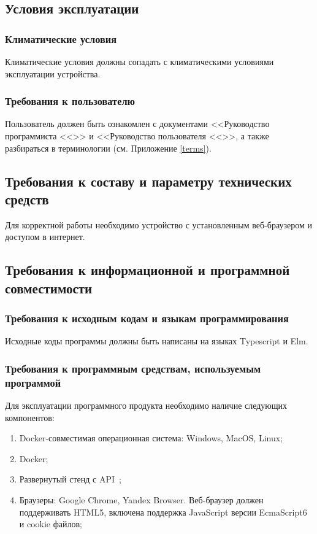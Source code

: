\documentclass[a4paper,12pt,reqno]{article}
\begin{document}
	
	\subsection{Условия эксплуатации}
	\subsubsection{Климатические условия}
	Климатические условия должны сопадать с климатическими условиями эксплуатации устройства. 
	\subsubsection{Требования к пользователю}
	
	Пользователь должен быть ознакомлен с документами <<Руководство программиста  <<>> и <<Руководство пользователя <<>>, а также разбираться в терминологии (см. Приложение \ref{terms}).
	\subsection{Требования к составу и параметру технических средств}
	
	Для корректной работы необходимо устройство с установленным веб-браузером и доступом в интернет.
	
	
	\subsection{Требования к информационной и программной совместимости}
	
	\subsubsection{Требования к исходным кодам и языкам программирования}
	
	Исходные коды программы должны быть написаны на языках Typescript и Elm.
	
	\subsubsection{Требования к программным средствам, используемым программой}
	
	Для эксплуатации программного продукта необходимо наличие следующих компонентов:
	
	\begin{enumerate}
	    \item Docker-совместимая операционная система: Windows, MacOS, Linux;
	    \item Docker;
	    \item Развернутый стенд с API~\cite{api};
	    \item Браузеры: Google Chrome, Yandex Browser. Веб-браузер должен поддерживать HTML5, включена поддержка JavaScript версии EcmaScript6 и cookie файлов; 
	\end{enumerate}
	
\end{document}
